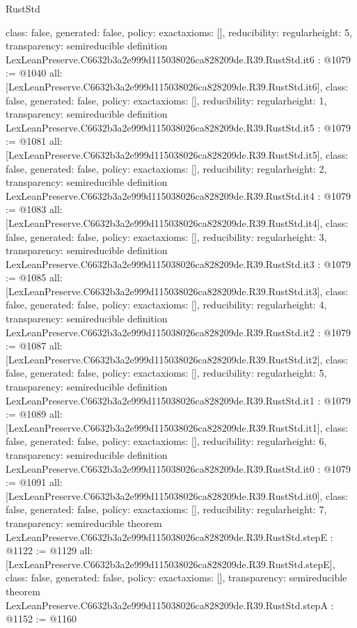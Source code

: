 \begin{lexlean}{RustStd}
\begin{coremodule}
{  class: false,
  generated: false,
  policy: exact{axioms: []},
  reducibility: regular{height: 5},
  transparency: semireducible
}
definition LexLeanPreserve.C6632b3a2e999d115038026ca828209de.R39.RustStd.it6 : @1079 := @1040 {
  all: [LexLeanPreserve.C6632b3a2e999d115038026ca828209de.R39.RustStd.it6],
  class: false,
  generated: false,
  policy: exact{axioms: []},
  reducibility: regular{height: 1},
  transparency: semireducible
}
definition LexLeanPreserve.C6632b3a2e999d115038026ca828209de.R39.RustStd.it5 : @1079 := @1081 {
  all: [LexLeanPreserve.C6632b3a2e999d115038026ca828209de.R39.RustStd.it5],
  class: false,
  generated: false,
  policy: exact{axioms: []},
  reducibility: regular{height: 2},
  transparency: semireducible
}
definition LexLeanPreserve.C6632b3a2e999d115038026ca828209de.R39.RustStd.it4 : @1079 := @1083 {
  all: [LexLeanPreserve.C6632b3a2e999d115038026ca828209de.R39.RustStd.it4],
  class: false,
  generated: false,
  policy: exact{axioms: []},
  reducibility: regular{height: 3},
  transparency: semireducible
}
definition LexLeanPreserve.C6632b3a2e999d115038026ca828209de.R39.RustStd.it3 : @1079 := @1085 {
  all: [LexLeanPreserve.C6632b3a2e999d115038026ca828209de.R39.RustStd.it3],
  class: false,
  generated: false,
  policy: exact{axioms: []},
  reducibility: regular{height: 4},
  transparency: semireducible
}
definition LexLeanPreserve.C6632b3a2e999d115038026ca828209de.R39.RustStd.it2 : @1079 := @1087 {
  all: [LexLeanPreserve.C6632b3a2e999d115038026ca828209de.R39.RustStd.it2],
  class: false,
  generated: false,
  policy: exact{axioms: []},
  reducibility: regular{height: 5},
  transparency: semireducible
}
definition LexLeanPreserve.C6632b3a2e999d115038026ca828209de.R39.RustStd.it1 : @1079 := @1089 {
  all: [LexLeanPreserve.C6632b3a2e999d115038026ca828209de.R39.RustStd.it1],
  class: false,
  generated: false,
  policy: exact{axioms: []},
  reducibility: regular{height: 6},
  transparency: semireducible
}
definition LexLeanPreserve.C6632b3a2e999d115038026ca828209de.R39.RustStd.it0 : @1079 := @1091 {
  all: [LexLeanPreserve.C6632b3a2e999d115038026ca828209de.R39.RustStd.it0],
  class: false,
  generated: false,
  policy: exact{axioms: []},
  reducibility: regular{height: 7},
  transparency: semireducible
}
theorem LexLeanPreserve.C6632b3a2e999d115038026ca828209de.R39.RustStd.stepE : @1122 := @1129 {
  all: [LexLeanPreserve.C6632b3a2e999d115038026ca828209de.R39.RustStd.stepE],
  class: false,
  generated: false,
  policy: exact{axioms: []},
  transparency: semireducible
}
theorem LexLeanPreserve.C6632b3a2e999d115038026ca828209de.R39.RustStd.stepA : @1152 := @1160 {
}
\end{coremodule}
\end{lexlean}
